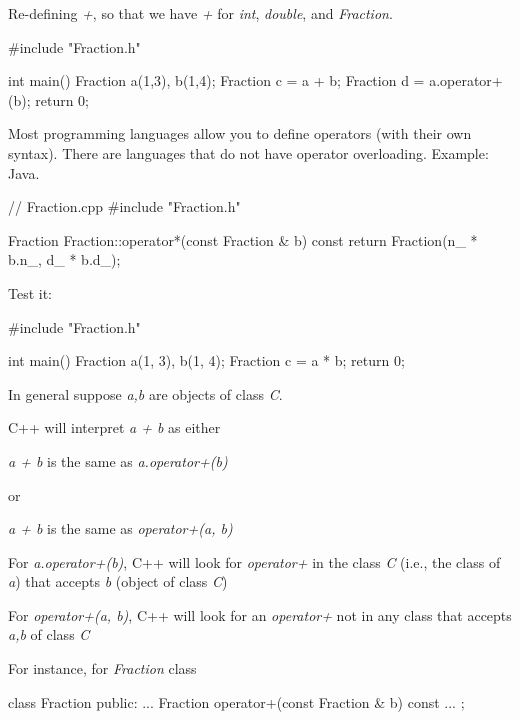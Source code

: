 Re-defining \textit{+}, so that we have \textit{+} for \textit{int},
\textit{double}, and \textit{Fraction}.

\begin{consolethree}[escapeinside=||]
#include "Fraction.h"

int main()
{
    Fraction a(1,3), b(1,4);
    Fraction c = a + b;
    Fraction d = a.operator+(b);
    return 0;
}
\end{consolethree}

Most programming languages allow you to define operators (with their own
syntax). There are languages that do not have operator overloading.
Example: Java.

\begin{consolethree}[escapeinside=||]
// Fraction.cpp
#include "Fraction.h"

Fraction Fraction::operator*(const Fraction & b) const
{
    return Fraction(n_ * b.n_, d_ * b.d_);
}
\end{consolethree}

Test it:

\begin{consolethree}[escapeinside=||]
#include "Fraction.h"

int main()
{
    Fraction a(1, 3), b(1, 4);
    Fraction c = a * b;
    return 0;
}
\end{consolethree}


\newpage{}

In general suppose \textit{a,b} are objects of class \textit{C}.

C++ will interpret \textit{a + b} as either

\textit{a + b} is the same as \textit{a.operator+(b)}

or

\textit{a + b} is the same as \textit{operator+(a, b)}

For \textit{a.operator+(b)}, C++ will look for \textit{operator+} in the
class \textit{C} (i.e., the class of \textit{a}) that accepts \textit{b}
(object of class \textit{C})

For \textit{operator+(a, b)}, C++ will look for an \textit{operator+} not in
any class that accepts \textit{a,b} of class \textit{C}

For instance, for \textit{Fraction} class

\begin{consolethree}[escapeinside=||]
class Fraction
{
public:
    ...
    Fraction operator+(const Fraction & b) const {...}
};
\end{consolethree}

